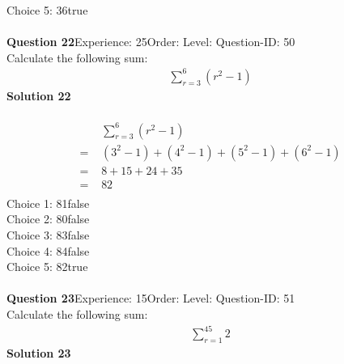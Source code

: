 \documentclass{article}
\begin{document}
Choice 5: \hspace{20pt}36\hspace{20pt}true\\
\\[4pt]
\noindent\textbf{Question 22}\hspace{20pt}Experience: 25\hspace{20pt}Order: \hspace{20pt}Level: \hspace{20pt}Question-ID: 50\\[2pt]
Calculate the following sum:
\begin{align*}
\sum_{r=3}^{6} (r^2-1)
\end{align*}
\noindent\textbf{Solution 22}\\[2pt]
\\[-35pt]\begin{align*}
&\sum_{r=3}^{6} (r^2-1)\\[2pt]
=\,\,&(3^2-1)+(4^2-1)+(5^2-1)+(6^2-1)\\[2pt]
=\,\,&8+15+24+35\\[2pt]
=\,\,&82\\[-20pt]
\end{align*}
Choice 1: \hspace{20pt}81\hspace{20pt}false\\
Choice 2: \hspace{20pt}80\hspace{20pt}false\\
Choice 3: \hspace{20pt}83\hspace{20pt}false\\
Choice 4: \hspace{20pt}84\hspace{20pt}false\\
Choice 5: \hspace{20pt}82\hspace{20pt}true\\
\\[4pt]
\noindent\textbf{Question 23}\hspace{20pt}Experience: 15\hspace{20pt}Order: \hspace{20pt}Level: \hspace{20pt}Question-ID: 51\\[2pt]
Calculate the following sum:
\begin{align*}
\sum_{r=1}^{45} 2
\end{align*}
\noindent\textbf{Solution 23}\\[2pt]
\end{document}
